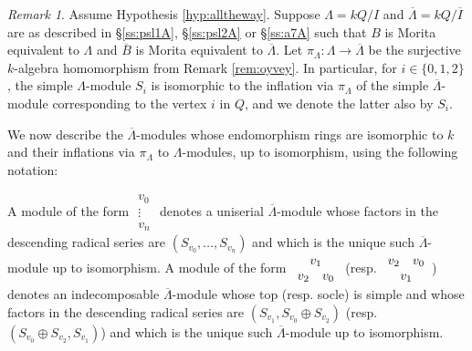 \documentclass{amsart}
\theoremstyle{plain}
\theoremstyle{definition}
\theoremstyle{remark}
\newtheorem{rem}[thm]{Remark}
\begin{document}
\begin{rem}
\label{rem:stablend}
Assume Hypothesis \ref{hyp:alltheway}. 
Suppose $\Lambda=kQ/I$ and $\overline{\Lambda}=kQ/\overline{I}$ are
as described in \S\ref{ss:psl1A}, \S\ref{ss:psl2A} or \S\ref{ss:a7A}
such that $B$ is Morita equivalent to $\Lambda$ and $\overline{B}$ is Morita 
equivalent to $\overline{\Lambda}$. Let $\pi_\Lambda:\Lambda\to\overline{\Lambda}$ 
be the surjective $k$-algebra
homomorphism from Remark \ref{rem:oyvey}. In particular, for $i\in\{0,1,2\}$,
the simple $\Lambda$-module $S_i$ is isomorphic to the
inflation via $\pi_\Lambda$ of the simple $\overline{\Lambda}$-module 
corresponding to the vertex $i$ in $Q$, and we denote the latter also by $S_i$.

We now describe the $\overline{\Lambda}$-modules whose endomorphism rings are isomorphic to $k$ 
and their inflations via $\pi_\Lambda$ to $\Lambda$-modules, up to isomorphism, using the following
notation:

A module of the form $\begin{array}{c}v_0\\[-.5ex] \vdots\\ v_n\end{array}$
denotes a uniserial $\overline{\Lambda}$-module whose factors in the descending 
radical series are  $(S_{v_0},\ldots,S_{v_n})$ and which is the unique such 
$\overline{\Lambda}$-module up to isomorphism.
A module of the form $\begin{array}{cc}\multicolumn{2}{c}{v_1}\\v_2&v_0\end{array}$ (resp. 
$\begin{array}{cc}v_2&v_0\\\multicolumn{2}{c}{v_1}\end{array}$) denotes an indecomposable
$\overline{\Lambda}$-module whose top (resp. socle) is simple and whose
factors in the descending radical series are
$(S_{v_1},S_{v_0}\oplus S_{v_2})$ (resp. $(S_{v_0}\oplus S_{v_2},S_{v_1})$)
and which is the unique such $\overline{\Lambda}$-module up to isomorphism.


\end{rem}
\end{document}
